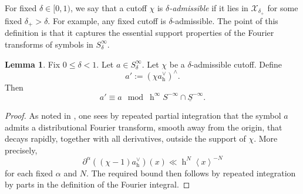 \documentclass[reqno]{amsart}
\DeclareMathOperator{\h}{h}
\theoremstyle{plain} \newtheorem{theorem} {Theorem}
\theoremstyle{definition} \newtheorem{definition} [theorem] {Definition}
\theoremstyle{itplain} %
\newtheorem{lemma}[theorem]{Lemma}
\numberwithin{equation}{section}
\numberwithin{theorem}{section}
\renewcommand{\leq}{\leqslant}
\begin{document}
For fixed $\delta \in [0,1)$, we say that a cutoff $\chi$ is \emph{$\delta$-admissible} if it lies in $\mathcal{X}_{\delta_+}$ for some fixed $\delta_+ > \delta$.  For example, any fixed cutoff is $\delta$-admissible.  The point of this definition is that it captures the essential support properties of the Fourier transforms of symbols in $S_\delta^\infty$.
\begin{lemma}\label{lem:fix-0-leq}
  Fix $0 \leq \delta < 1$.  Let $a \in S_\delta^{\infty}$.  Let $\chi$ be a $\delta$-admissible cutoff.  Define
  \begin{equation}\label{eq:a-:=-chi}
    a' := (\chi a_{\h}^\vee)^\wedge.
  \end{equation}
  Then
  \begin{equation}\label{eq:a-equiv-pmodhinfty}
    a' \equiv a \mod{\h^\infty S^{-\infty} \cap \underline{S}^{-\infty}}.
  \end{equation}
\end{lemma}
\begin{proof}
  As noted in \cite[\S8.2]{nelson-venkatesh-1}, one sees by repeated partial integration that the symbol $a$ admits a distributional Fourier transform, smooth away from the origin, that decays rapidly, together with all derivatives, outside the support of $\chi$.  More precisely,
  \begin{equation*}
    \partial^{\alpha} ((\chi - 1) a_{\h}^\vee) (x) \ll \h^N \left\langle x \right\rangle^{-N}
  \end{equation*}
  for each fixed $\alpha$ and $N$.    The required bound then follows by repeated integration by parts in the definition of the Fourier integral.
\end{proof}
\end{document}
